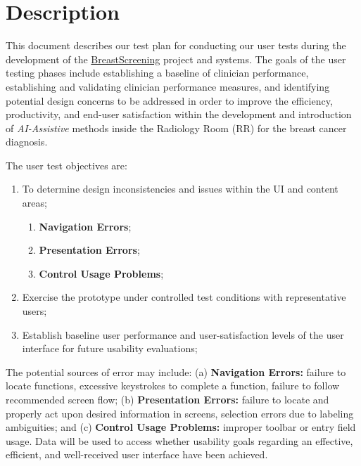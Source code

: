 
\section{Description}
\label{sec:sec002}

This document describes our test plan for conducting our user tests during the development of the \hyperlink{https://breastscreening.github.io/}{BreastScreening} project and systems. The goals of the user testing phases include establishing a baseline of clinician performance, establishing and validating clinician performance measures, and identifying potential design concerns to be addressed in order to improve the efficiency, productivity, and end-user satisfaction within the development and introduction of \textit{AI-Assistive} methods inside the Radiology Room (RR) for the breast cancer diagnosis.


\hfill

The user test objectives are:

\begin{enumerate}
\item To determine design inconsistencies and issues within the UI and content areas;
\begin{enumerate}
\item \textbf{Navigation Errors};
\item \textbf{Presentation Errors};
\item \textbf{Control Usage Problems};
\end{enumerate}
\item Exercise the prototype under controlled test conditions with representative users;
\item Establish baseline user performance and user-satisfaction levels of the user interface for future usability evaluations;
\end{enumerate}


The potential sources of error may include: (a) \textbf{Navigation Errors:} failure to locate functions, excessive keystrokes to complete a function, failure to follow recommended screen flow; (b) \textbf{Presentation Errors:} failure to locate and properly act upon desired information in screens, selection errors due to labeling ambiguities; and (c) \textbf{Control Usage Problems:} improper toolbar or entry field usage. Data will be used to access whether usability goals regarding an effective, efficient, and well-received user interface have been achieved.

